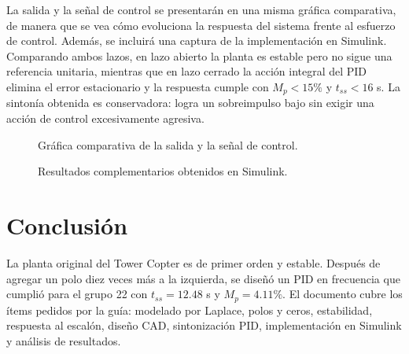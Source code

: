 \documentclass[conference]{IEEEtran}
\begin{document}
La salida y la se\~nal de control se presentar\'an en una misma gr\'afica comparativa, de manera que se vea c\'omo evoluciona la respuesta del sistema frente al esfuerzo de control. Adem\'as, se incluir\'a una captura de la implementaci\'on en Simulink. Comparando ambos lazos, en lazo abierto la planta es estable pero no sigue una referencia unitaria, mientras que en lazo cerrado la acci\'on integral del PID elimina el error estacionario y la respuesta cumple con $M_p<15\%$ y $t_{ss}<16$ s. La sinton\'ia obtenida es conservadora: logra un sobreimpulso bajo sin exigir una acci\'on de control excesivamente agresiva.

\begin{table}[!t]
\caption{Resumen de resultados del controlador}
\label{tab:resumen}
\centering
\scriptsize
{}
\end{table}

\begin{figure}[!t]
\centering
{}
\caption{Gr\'afica comparativa de la salida y la se\~nal de control.}
\label{fig:matlab}
\end{figure}

\begin{figure}[!t]
\centering
\begin{minipage}{0.48\columnwidth}
\centering
{}
\end{minipage}\hfill
\begin{minipage}{0.48\columnwidth}
\centering
{}
\end{minipage}
\caption{Resultados complementarios obtenidos en Simulink.}
\label{fig:simulink}
\end{figure}

\section{Conclusi\'on}
La planta original del Tower Copter es de primer orden y estable. Despu\'es de agregar un polo diez veces m\'as a la izquierda, se dise\~n\'o un PID en frecuencia que cumpli\'o para el grupo 22 con $t_{ss}=12.48$ s y $M_p=4.11\%$. El documento cubre los \'items pedidos por la gu\'ia: modelado por Laplace, polos y ceros, estabilidad, respuesta al escal\'on, dise\~no CAD, sintonizaci\'on PID, implementaci\'on en Simulink y an\'alisis de resultados.
\end{document}

